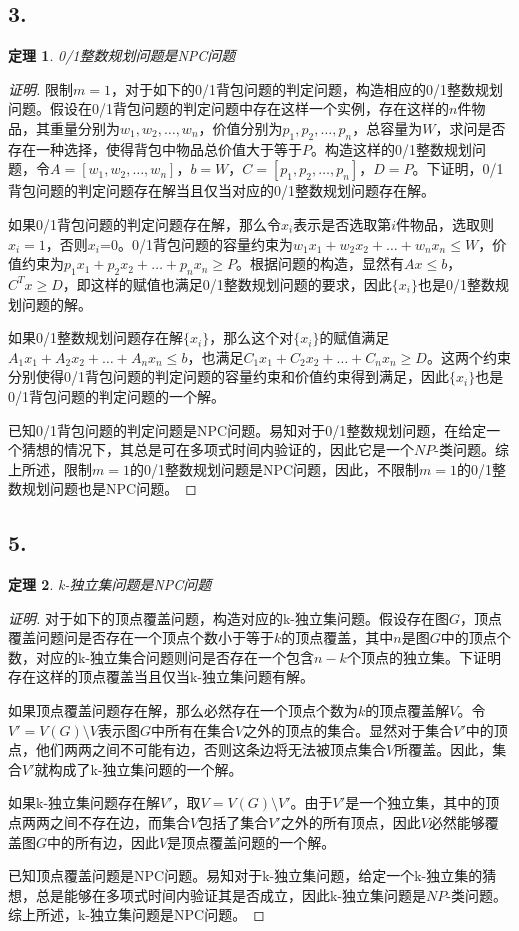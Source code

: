 \documentclass[a4paper]{article}
\newtheorem{theorem}{定理}
\begin{document}
\subsection*{3.}
\begin{theorem}
  0/1整数规划问题是NPC问题
\end{theorem}
\begin{proof}[证明]
  限制$m=1$，对于如下的0/1背包问题的判定问题，构造相应的0/1整数规划问题。假设在0/1背包问题的判定问题中存在这样一个实例，存在这样的$n$件物品，其重量分别为$w_1, w_2, \dots, w_n$，价值分别为$p_1, p_2, \dots, p_n$，总容量为$W$，求问是否存在一种选择，使得背包中物品总价值大于等于$P$。构造这样的0/1整数规划问题，令$A=[w_1, w_2, \dots, w_n]$，$b=W$，$C=[p_1, p_2, \dots, p_n]$，$D=P$。下证明，0/1背包问题的判定问题存在解当且仅当对应的0/1整数规划问题存在解。

  如果0/1背包问题的判定问题存在解，那么令$x_i$表示是否选取第$i$件物品，选取则$x_i=1$，否则$x_i$=0。0/1背包问题的容量约束为$w_1x_1+w_2x_2+\dots+w_nx_n\leq W$，价值约束为$p_1x_1+p_2x_2+\dots+p_nx_n\geq P$。根据问题的构造，显然有$Ax\leq b$，$C^Tx\geq D$，即这样的赋值也满足0/1整数规划问题的要求，因此$\{x_i\}$也是0/1整数规划问题的解。

  如果0/1整数规划问题存在解$\{x_i\}$，那么这个对$\{x_i\}$的赋值满足$A_1x_1+A_2x_2+\dots+A_nx_n\leq b$，也满足$C_1x_1+C_2x_2+\dots+C_nx_n\geq D$。这两个约束分别使得0/1背包问题的判定问题的容量约束和价值约束得到满足，因此$\{x_i\}$也是0/1背包问题的判定问题的一个解。

  已知0/1背包问题的判定问题是NPC问题。易知对于0/1整数规划问题，在给定一个猜想的情况下，其总是可在多项式时间内验证的，因此它是一个$NP$-类问题。综上所述，限制$m=1$的0/1整数规划问题是NPC问题，因此，不限制$m=1$的0/1整数规划问题也是NPC问题。
\end{proof}

\subsection*{5.}
\begin{theorem}
  k-独立集问题是NPC问题
\end{theorem}
\begin{proof}[证明]
  对于如下的顶点覆盖问题，构造对应的k-独立集问题。假设存在图$G$，顶点覆盖问题问是否存在一个顶点个数小于等于$k$的顶点覆盖，其中$n$是图$G$中的顶点个数，对应的k-独立集合问题则问是否存在一个包含$n-k$个顶点的独立集。下证明存在这样的顶点覆盖当且仅当k-独立集问题有解。

  如果顶点覆盖问题存在解，那么必然存在一个顶点个数为$k$的顶点覆盖解$V$。令$V'=V(G)\setminus V$表示图$G$中所有在集合$V$之外的顶点的集合。显然对于集合$V'$中的顶点，他们两两之间不可能有边，否则这条边将无法被顶点集合$V$所覆盖。因此，集合$V'$就构成了k-独立集问题的一个解。

  如果k-独立集问题存在解$V'$，取$V=V(G)\setminus V'$。由于$V'$是一个独立集，其中的顶点两两之间不存在边，而集合$V$包括了集合$V'$之外的所有顶点，因此$V$必然能够覆盖图$G$中的所有边，因此$V$是顶点覆盖问题的一个解。

  已知顶点覆盖问题是NPC问题。易知对于k-独立集问题，给定一个k-独立集的猜想，总是能够在多项式时间内验证其是否成立，因此k-独立集问题是$NP$-类问题。综上所述，k-独立集问题是NPC问题。
\end{proof}
\end{document}
